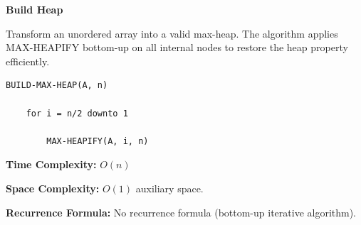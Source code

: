 \documentclass[a4paper,12pt]{article}
\begin{document}
\begin{tcolorbox}[
    colback=gray!30,
    colframe=black,
    boxrule=1pt,
    arc=0mm
]

\begin{tcolorbox}[
    colback=gray!10,
    colframe=black,
    arc=0mm
]
\centering
{\Huge\bfseries Build Heap}
\end{tcolorbox}


\begin{tcolorbox}[
    colback=gray!10,
    colframe=black,
    arc=0mm
]
\small
Transform an unordered array into a valid max-heap.
The algorithm applies MAX-HEAPIFY bottom-up on all internal nodes
to restore the heap property efficiently.
\end{tcolorbox}


\begin{tcolorbox}[
    colback=black!5,
    colframe=black,
    arc=0mm,
    title=Pseudo-code
]
\tiny
\begin{lstlisting}
BUILD-MAX-HEAP(A, n)

    for i = n/2 downto 1

        MAX-HEAPIFY(A, i, n)
\end{lstlisting}
\end{tcolorbox}


\begin{tcolorbox}[
    colback=cyan!20,
    colframe=black,
    arc=0mm
]
\small
\textbf{Time Complexity:}
$O(n)$
\end{tcolorbox}


\begin{tcolorbox}[
    colback=violet!20,
    colframe=black,
    arc=0mm
]
\small
\textbf{Space Complexity:}
$O(1)$ auxiliary space.
\end{tcolorbox}


\begin{tcolorbox}[
    colback=pink!20,
    colframe=black,
    arc=0mm
]
\small
\textbf{Recurrence Formula:}
No recurrence formula (bottom-up iterative algorithm).
\end{tcolorbox}

\end{tcolorbox}
\end{document}
